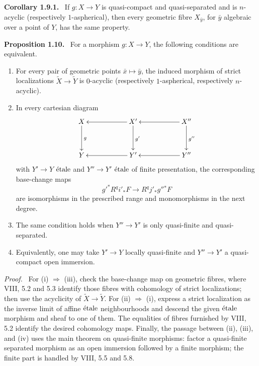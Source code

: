 \documentclass[12pt]{article}
\newcommand{\etale}{\ifmmode\textnormal{\'etale}\else\'etale\fi}
\newenvironment{statement}[1]{\par\medskip\noindent\textbf{#1.}\ }{\par\medskip}
\newenvironment{prooftext}[1][Proof]{\par\noindent\emph{#1.}\ }{\par\medskip}
\begin{document}
\begin{statement}{Corollary 1.9.1}
If \(g:X\to Y\) is quasi-compact and quasi-separated and is \(n\)-acyclic (respectively \(1\)-aspherical), then every geometric fibre \(X_{\bar y}\), for \(\bar y\) algebraic over a point of \(Y\), has the same property.
\end{statement}

\begin{statement}{Proposition 1.10}
For a morphism \(g:X\to Y\), the following conditions are equivalent.
\begin{enumerate}[label=(\roman*)]
\item For every pair of geometric points \(\bar x\mapsto\bar y\), the induced morphism of strict localizations \(\widetilde X\to\widetilde Y\) is \(0\)-acyclic (respectively \(1\)-aspherical, respectively \(n\)-acyclic).
\item In every cartesian diagram
\[
\xymatrix@C=2cm@R=1.2cm{
X\ar[d]^g&X'\ar[l]\ar[d]^{g'}&X''\ar[l]\ar[d]^{g''}\\
Y&Y'\ar[l]&Y''\ar[l]
}
\]
with \(Y'\to Y\) \(\etale\) and \(Y''\to Y'\) \(\etale\) of finite presentation, the corresponding base-change maps
\[
g'^*R^qi'_*F\longrightarrow R^qj'_*g''{}^*F
\]
are isomorphisms in the prescribed range and monomorphisms in the next degree.
\item The same condition holds when \(Y''\to Y'\) is only quasi-finite and quasi-separated.
\item Equivalently, one may take \(Y'\to Y\) locally quasi-finite and \(Y''\to Y'\) a quasi-compact open immersion.
\end{enumerate}
\end{statement}

\begin{prooftext}
For (i) \(\Rightarrow\) (iii), check the base-change map on geometric fibres, where VIII, 5.2 and 5.3 identify those fibres with cohomology of strict localizations; then use the acyclicity of \(\widetilde X\to\widetilde Y\). For (ii) \(\Rightarrow\) (i), express a strict localization as the inverse limit of affine \(\etale\) neighbourhoods and descend the given \(\etale\) morphism and sheaf to one of them. The equalities of fibres furnished by VIII, 5.2 identify the desired cohomology maps. Finally, the passage between (ii), (iii), and (iv) uses the main theorem on quasi-finite morphisms: factor a quasi-finite separated morphism as an open immersion followed by a finite morphism; the finite part is handled by VIII, 5.5 and 5.8.
\end{prooftext}
\end{document}
